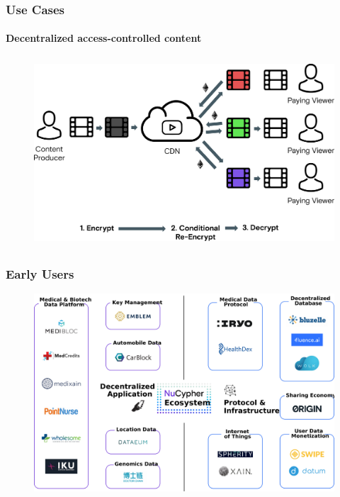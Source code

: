 \documentclass[xetex,mathsans,sans,aspectratio=169]{beamer}
\begin{document}
    \begin{frame}
        \frametitle{Use Cases}
        \framesubtitle{Decentralized access-controlled content}
        \begin{figure}
            \centering
            \includegraphics[height=7cm]{pdf/streams-alternative.pdf}
        \end{figure}
    \end{frame}

    \begin{frame}
      \frametitle{Early Users}
      \begin{figure}
           \includegraphics[width=11.5cm]{pdf/projects.pdf}
      \end{figure}
    \end{frame}
\end{document}
